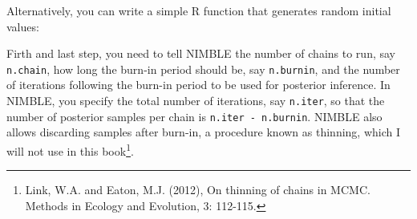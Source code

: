 \documentclass[
  12pt,
]{krantz}
\newenvironment{Shaded}{\begin{snugshade}}{\end{snugshade}}
\newcommand{\AttributeTok}[1]{\textcolor[rgb]{0.13,0.29,0.53}{#1}}
\newcommand{\ControlFlowTok}[1]{\textcolor[rgb]{0.13,0.29,0.53}{\textbf{#1}}}
\newcommand{\DecValTok}[1]{\textcolor[rgb]{0.00,0.00,0.81}{#1}}
\newcommand{\DocumentationTok}[1]{\textcolor[rgb]{0.56,0.35,0.01}{\textbf{\textit{#1}}}}
\newcommand{\FloatTok}[1]{\textcolor[rgb]{0.00,0.00,0.81}{#1}}
\newcommand{\FunctionTok}[1]{\textcolor[rgb]{0.13,0.29,0.53}{\textbf{#1}}}
\newcommand{\NormalTok}[1]{#1}
\newcommand{\OtherTok}[1]{\textcolor[rgb]{0.56,0.35,0.01}{#1}}
\begin{document}
\begin{Shaded}
\end{Shaded}

Alternatively, you can write a simple R function that generates random initial values:

\begin{Shaded}
\end{Shaded}

Firth and last step, you need to tell NIMBLE the number of chains to run, say \texttt{n.chain}, how long the burn-in period should be, say \texttt{n.burnin}, and the number of iterations following the burn-in period to be used for posterior inference. In NIMBLE, you specify the total number of iterations, say \texttt{n.iter}, so that the number of posterior samples per chain is \texttt{n.iter\ -\ n.burnin}. NIMBLE also allows discarding samples after burn-in, a procedure known as thinning, which I will not use in this book\footnote{Link, W.A. and Eaton, M.J. (2012), On thinning of chains in MCMC. Methods in Ecology and Evolution, 3: 112-115.}.
\end{document}
